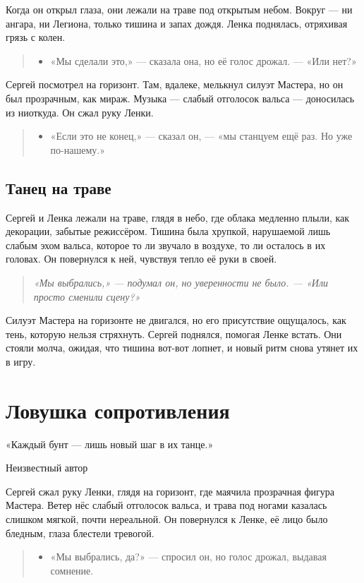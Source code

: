 \documentclass[12pt,a4paper]{book}
\newenvironment{dialogue}{\begin{quote}\itshape\begin{itemize}\item[]}{\end{itemize}\end{quote}}
\newenvironment{innerthought}{\begin{quote}\small\itshape}{\end{quote}}
\begin{document}
Когда он открыл глаза, они лежали на траве под открытым небом. Вокруг --- ни ангара, ни Легиона, только тишина и запах дождя. Ленка поднялась, отряхивая грязь с колен.

\begin{dialogue}
«Мы сделали это,» --- сказала она, но её голос дрожал. --- «Или нет?»
\end{dialogue}

Сергей посмотрел на горизонт. Там, вдалеке, мелькнул силуэт Мастера, но он был прозрачным, как мираж. Музыка --- слабый отголосок вальса --- доносилась из ниоткуда. Он сжал руку Ленки.

\begin{dialogue}
«Если это не конец,» --- сказал он, --- «мы станцуем ещё раз. Но уже по-нашему.»
\end{dialogue}

\section{Танец на траве}

Сергей и Ленка лежали на траве, глядя в небо, где облака медленно плыли, как декорации, забытые режиссёром. Тишина была хрупкой, нарушаемой лишь слабым эхом вальса, которое то ли звучало в воздухе, то ли осталось в их головах. Он повернулся к ней, чувствуя тепло её руки в своей.

\begin{innerthought}
«Мы выбрались,» --- подумал он, но уверенности не было. --- «Или просто сменили сцену?»
\end{innerthought}

Силуэт Мастера на горизонте не двигался, но его присутствие ощущалось, как тень, которую нельзя стряхнуть. Сергей поднялся, помогая Ленке встать. Они стояли молча, ожидая, что тишина вот-вот лопнет, и новый ритм снова утянет их в игру.

\chapter{Ловушка сопротивления}
\epigraph{«Каждый бунт — лишь новый шаг в их танце.»}{Неизвестный автор}

Сергей сжал руку Ленки, глядя на горизонт, где маячила прозрачная фигура Мастера. Ветер нёс слабый отголосок вальса, и трава под ногами казалась слишком мягкой, почти нереальной. Он повернулся к Ленке, её лицо было бледным, глаза блестели тревогой.

\begin{dialogue}
«Мы выбрались, да?» --- спросил он, но голос дрожал, выдавая сомнение.
\end{dialogue}
\end{document}
